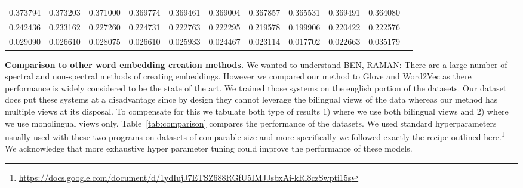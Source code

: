 \documentclass[11pt]{article}
\begin{document}
\begin{table*}[htbp]
\begin{tabular}{ccccccccccc}
0.373794 & 0.373203 & 0.371000 & 0.369774 & 0.369461 & 0.369004       & 0.367857         &         0.365531   & 0.369491 & 0.364080                &     \\       
0.242436 & 0.233162 & 0.227260 & 0.224731 & 0.222763 & 0.222295       & 0.219578         &         0.199906   & 0.220422 & 0.222576                &     \\       
0.029090 & 0.026610 & 0.028075 & 0.026610 & 0.025933 & 0.024467       & 0.023114         &         0.017702   & 0.022663 & 0.035179                &     \\       
  \end{tabular}
  \caption{Performance versus subsets of views input to GCCA. The
    model specification string is
    ``mc\_FreqPow025-truncatele200\_100~"\$pc",300\_1e-5,monomultiwindow.300''. Replace
    pc by headers of the columns . -m12,en means that the
  we removed monolingual views of half size 1 and 2 and we removed
  monolingual view made from left and right neighbors.}
  \label{tab:multiviewcontri}
\end{table*}


\textbf{Comparison to other word embedding creation methods.}
We wanted to understand 
{BEN, RAMAN: There are a large number of spectral and non-spectral
  methods of creating embeddings. However we compared our method to
  Glove and Word2Vec as there performance is widely considered to be
  the state of the art.} We trained those systems on the english
portion of the datasets. Our dataset does put these systems at a
disadvantage since by design they cannot leverage the bilingual views of
the data whereas our method has multiple views at its disposal. To
compensate for this we tabulate both type of results 1) where we use
both bilingual views and 2) where we use monolingual views
only. Table~\ref{tab:comparison} compares the performance of the
datasets. We used standard hyperparameters usually used with these two
programs on datasets of comparable size and more specifically we
followed exactly the recipe outlined
here.\footnote{\url{https://docs.google.com/document/d/1ydIujJ7ETSZ688RGfU5IMJJsbxAi-kRl8czSwpti15s}}
We acknowledge that more exhaustive hyper parameter tuning could
improve the performance of these models.
\end{document}
